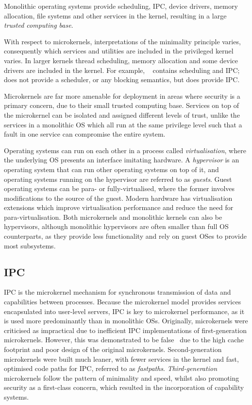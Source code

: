 Monolithic operating systems provide scheduling, \gls{IPC}, device drivers, memory allocation, file
systems and other services in the kernel, resulting in a large \emph{trusted computing base}.

With respect to microkernels, interpretations of the minimality principle varies, 
consequently which services and utilities are included in the privileged kernel varies. In
larger kernels thread scheduling, memory allocation and some device drivers are included in the kernel.
For example, \selfour~\citep{Klein_EHACDEEKNSTW_09} contains scheduling and \gls{IPC}; 
\composite~\citep{Parmer:phd} does not provide a scheduler, or any blocking semantics, but does
provide \gls{IPC}. 

Microkernels are far more amenable for deployment in areas where security is a primary concern,
due to their small trusted computing base.
Services on top of the microkernel can be isolated and assigned different levels of trust, unlike
the services in a monolithic \gls{OS} which all run at the same privilege level such that a fault in
one service can compromise the entire system. 

Operating systems can run on each other in a process called \emph{virtualisation}, where the
underlying OS presents an interface imitating hardware. A \emph{hypervisor} is an operating system that can
run other operating systems on top of it, and operating systems running on the hypervisor are
referred to as \emph{guests}. Guest operating systems can be para- or fully-virtualised, where the
former involves modifications to the source of the guest. Modern hardware has virtualisation
extensions which improve virtualisation performance and reduce the need for para-virtualisation.
Both microkernels and monolithic kernels can also be hypervisors, although monolithic hypervisors
are often smaller than full OS counterparts, as they provide less functionality and rely on guest
OSes to provide most subsystems. 

\subsection{IPC}
\label{s:background-ipc}

\gls{IPC} is the microkernel mechanism for synchronous transmission of data and capabilities between
processes. Because the microkernel model provides services encapsulated into user-level servers,
\gls{IPC} is key to microkernel performance, as it is used more predominantly than in monolithic
\glspl{OS}. Originally, microkernels were criticised as impractical due to inefficient IPC
implementations of first-generation microkernels. However, this was demonstrated to be
false~\citep{Hartig_HLSW_97} due to the high cache footprint and poor design of the original
microkernels. Second-generation microkernels were built much leaner, with fewer services in the
kernel and fast, optimised code paths for IPC, referred to as \emph{fastpaths}. 
\emph{Third-generation} microkernels follow the pattern of minimality and speed, whilst also
promoting security as a first-class concern, which resulted in the incorporation of capability
systems.  

